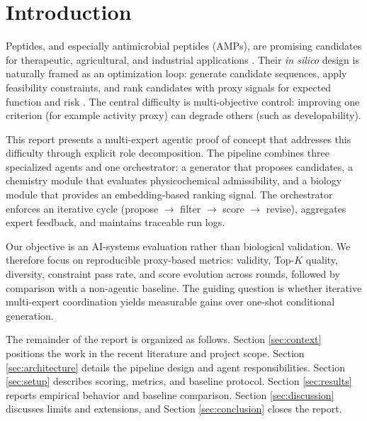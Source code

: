 \section{Introduction}\label{sec:introduction}

Peptides, and especially antimicrobial peptides (AMPs), are promising candidates for therapeutic, agricultural, and industrial applications \cite{wang2022machine}. Their \textit{in silico} design is naturally framed as an optimization loop: generate candidate sequences, apply feasibility constraints, and rank candidates with proxy signals for expected function and risk \cite{wang2022machine,veltri2018deep}. The central difficulty is multi-objective control: improving one criterion (for example activity proxy) can degrade others (such as developability).

This report presents a multi-expert agentic proof of concept that addresses this difficulty through explicit role decomposition. The pipeline combines three specialized agents and one orchestrator: a generator that proposes candidates, a chemistry module that evaluates physicochemical admissibility, and a biology module that provides an embedding-based ranking signal. The orchestrator enforces an iterative cycle (propose $\rightarrow$ filter $\rightarrow$ score $\rightarrow$ revise), aggregates expert feedback, and maintains traceable run logs.

Our objective is an AI-systems evaluation rather than biological validation. We therefore focus on reproducible proxy-based metrics: validity, Top-$K$ quality, diversity, constraint pass rate, and score evolution across rounds, followed by comparison with a non-agentic baseline. The guiding question is whether iterative multi-expert coordination yields measurable gains over one-shot conditional generation.

The remainder of the report is organized as follows. Section \ref{sec:context} positions the work in the recent literature and project scope. Section \ref{sec:architecture} details the pipeline design and agent responsibilities. Section \ref{sec:setup} describes scoring, metrics, and baseline protocol. Section \ref{sec:results} reports empirical behavior and baseline comparison. Section \ref{sec:discussion} discusses limits and extensions, and Section \ref{sec:conclusion} closes the report.